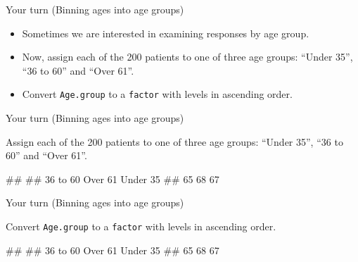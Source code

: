 \documentclass[ignorenonframetext,]{beamer}
\newenvironment{Shaded}{\begin{snugshade}}{\end{snugshade}}
\newcommand{\KeywordTok}[1]{\textcolor[rgb]{0.13,0.29,0.53}{\textbf{#1}}}
\newcommand{\DecValTok}[1]{\textcolor[rgb]{0.00,0.00,0.81}{#1}}
\newcommand{\StringTok}[1]{\textcolor[rgb]{0.31,0.60,0.02}{#1}}
\newcommand{\OperatorTok}[1]{\textcolor[rgb]{0.81,0.36,0.00}{\textbf{#1}}}
\newcommand{\NormalTok}[1]{#1}
\providecommand{\tightlist}{%
  \setlength{\itemsep}{0pt}\setlength{\parskip}{0pt}}
\let\oldShaded\Shaded
\let\endoldShaded\endShaded
\renewenvironment{Shaded}{\footnotesize\oldShaded}{\endoldShaded}
\let\oldverbatim\verbatim
\let\endoldverbatim\endverbatim
\renewenvironment{verbatim}{\footnotesize\oldverbatim}{\endoldverbatim}
\begin{document}
\begin{frame}[fragile]{Your turn (Binning ages into age groups)}

\begin{itemize}
\tightlist
\item
  Sometimes we are interested in examining responses by age group.
\item
  Now, assign each of the 200 patients to one of three age groups:
  ``Under 35'', ``36 to 60'' and ``Over 61''.
\item
  Convert \texttt{Age.group} to a \texttt{factor} with levels in
  ascending order.
\end{itemize}

\end{frame}

\begin{frame}[fragile]{Your turn (Binning ages into age groups)}

Assign each of the 200 patients to one of three age groups: ``Under
35'', ``36 to 60'' and ``Over 61''.

\begin{Shaded}
\end{Shaded}

\begin{verbatim}
## 
## 36 to 60  Over 61 Under 35 
##       65       68       67
\end{verbatim}

\end{frame}

\begin{frame}[fragile]{Your turn (Binning ages into age groups)}

Convert \texttt{Age.group} to a \texttt{factor} with levels in ascending
order.

\begin{Shaded}
\end{Shaded}

\begin{verbatim}
## 
## 36 to 60  Over 61 Under 35 
##       65       68       67
\end{verbatim}

\end{frame}
\end{document}
